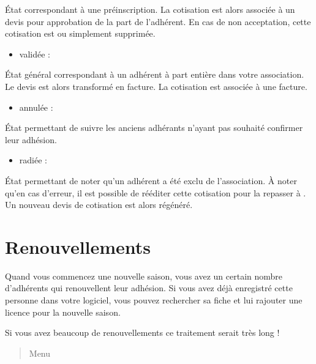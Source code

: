 \documentclass[a4paper,10pt,oneside,french]{sphinxmanual}
\begin{document}
\sphinxAtStartPar
État correspondant à une préinscription.
La cotisation est alors associée à un devis pour approbation de la part de l’adhérent.
En cas de non acceptation, cette cotisation est  ou simplement supprimée.
\begin{itemize}
\item {} 
\sphinxAtStartPar
validée :

\end{itemize}

\sphinxAtStartPar
État général correspondant à un adhérent à part entière dans votre association.
Le devis est alors transformé en facture.
La cotisation est associée à une facture.
\begin{itemize}
\item {} 
\sphinxAtStartPar
annulée :

\end{itemize}

\sphinxAtStartPar
État permettant de suivre les anciens adhérants n’ayant pas souhaité confirmer leur adhésion.
\begin{itemize}
\item {} 
\sphinxAtStartPar
radiée :

\end{itemize}

\sphinxAtStartPar
État permettant de noter qu’un adhérent a été exclu de l’association.
À noter qu’en cas d’erreur, il est possible de rééditer cette cotisation pour la repasser à . Un nouveau devis de cotisation est alors régénéré.


\section{Renouvellements}
\label{\detokenize{member/renew:renouvellements}}\label{\detokenize{member/renew::doc}}
\sphinxAtStartPar
Quand vous commencez une nouvelle saison, vous avez un certain nombre d’adhérents qui renouvellent leur adhésion. Si vous avez déjà enregistré cette personne dans votre logiciel, vous pouvez rechercher sa fiche et lui rajouter une licence pour la nouvelle saison.

\sphinxAtStartPar
Si vous avez beaucoup de renouvellements ce traitement serait très long !
\begin{quote}

\sphinxAtStartPar
Menu 
\end{quote}
\end{document}
